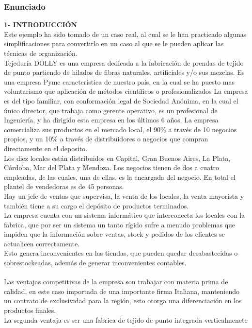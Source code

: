 \documentclass[a4paper,10pt,titlepage]{article}
\begin{document}
\subsubsection{Enunciado}
\textbf{1- INTRODUCCI\'ON}\\
Este ejemplo ha sido tomado de un caso real, al cual se le han practicado algunas
simplificaciones para convertirlo en un caso al que se le pueden aplicar las técnicas
de organización.\\
Tejeduría DOLLY es una empresa dedicada a la fabricación de prendas de tejido
de punto partiendo de hilados de fibras naturales, artificiales y/o sus mezclas.
Es una empresa Pyme característica de nuestro país, en la cual se ha puesto mas
voluntarismo que aplicación de métodos científicos o profesionalizados
La empresa es del tipo familiar, con conformación legal de Sociedad Anónima, en
la cual el único director, que trabaja como gerente operativo, es un profesional de
Ingeniería, y ha dirigido esta empresa en los últimos 6 años.
La empresa comercializa sus productos en el mercado local, el 90\% a través de 10
negocios propios, y un 10\% a través de distribuidores o negocios que compran
directamente en el deposito.\\
Los diez locales están distribuidos en Capital, Gran Buenos Aires, La Plata,
Córdoba, Mar del Plata y Mendoza. Los negocios tienen de dos a cuatro
empleadas, de las cuales, una de ellas, es la encargada del negocio. En total el
plantel de vendedoras es de 45 personas.\\
Hay un jefe de ventas que supervisa, la venta de los locales, la venta mayorista y
también tiene a su cargo el depósito de productos terminados.\\
La empresa cuenta con un sistema informático que interconecta los locales con la
fabrica, que por ser un sistema un tanto rígido sufre a menudo problemas que
impiden que la información sobre ventas, stock y pedidos de los clientes se
actualicen correctamente.\\
Esto genera inconvenientes en las tiendas, que pueden quedar desabastecidas o
sobrestockeadas, además de generar inconvenientes contables.\\ \\
Las ventajas competitivas de la empresa son trabajar con materia prima de calidad,
en este caso importada de una importante firma Italiana, manteniendo un contrato
de exclusividad para la región, esto otorga una diferenciación en los productos
finales.\\
La segunda ventaja es ser una fabrica de tejido de punto integrada verticalmenete
\end{document}
